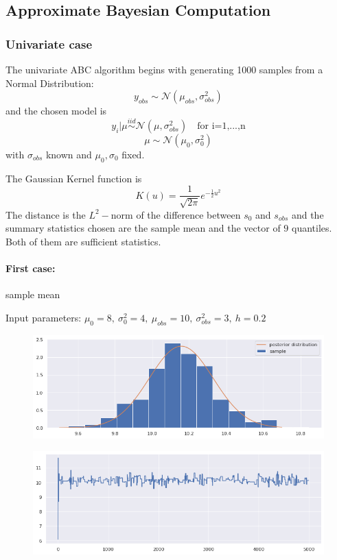 \documentclass {article}
\begin{document}
\subsection{Approximate Bayesian Computation}

\subsubsection{Univariate case}
The univariate ABC algorithm begins with generating 1000 samples from a Normal Distribution:
$$
	y_{obs} \sim  \mathcal{N} (\mu_{obs}, \sigma_{obs} ^2)
$$ 
and the chosen model is
$$
	y_{i} | \mu  \overset{iid}\sim \mathcal{N}(\mu, \sigma_{obs} ^2) \quad \text{for i=1,...,n}
$$
$$
	\mu  \sim \mathcal{N}(\mu_{0}, \sigma_{0}^2)
$$
with $ \sigma_{obs}$ known and $\mu_{0}, \sigma_{0} $ fixed.

The Gaussian Kernel function is
$$
	K(u) = \frac{1}{\sqrt{2\pi}} e^{-\frac{1}{2}u^2}
$$
The distance is the $L^2-$norm of the difference between $s_{0}$ and $s_{obs}$ and the summary statistics chosen are the sample mean and the vector of $9$ quantiles. Both of them are sufficient statistics.

\paragraph{First case:} sample mean\\
\begin{center} Input parameters: $\mu_{0}=8,\  \sigma_{0}^2=4,\  \mu_{obs}=10,\  \sigma_{obs}^2 =3,\ h=0.2$   \end{center}

\begin{figure}[h!]
	\centering
	\includegraphics[width=\textwidth]{immagini_abc/h0.2}	
	\caption{}
	\label{abch02}
\end{figure}
\begin{figure}[h!]
	\centering
	\includegraphics[width=\textwidth]{immagini_abc/sample0.2}	
	\caption{}
	\label{abcsample02}
\end{figure}
\end{document}
